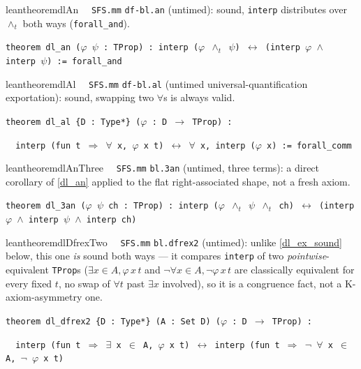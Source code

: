 \begin{restatable}{leantheorem}{dlAn}~~ \texttt{SFS.mm} \texttt{df-bl.an} (untimed): sound, \texttt{interp} distributes over $\wedge_t$ both ways (\texttt{forall\_and}).

\texttt{\textcolor{leancolor}{theorem} \textcolor{leanyellow}{dl\_an} ($\varphi$ $\psi$ : TProp) : interp ($\varphi$ $\wedge_t$ $\psi$) $\leftrightarrow$ (interp $\varphi$ $\wedge$ interp $\psi$) := forall\_and}
\label{dl_an}
\end{restatable}

\begin{restatable}{leantheorem}{dlAl}~~ \texttt{SFS.mm} \texttt{df-bl.al} (untimed universal-quantification exportation): sound, swapping two $\forall$s is always valid.

\texttt{\textcolor{leancolor}{theorem} \textcolor{leanyellow}{dl\_al} \{D : Type*\} ($\varphi$ : D $\to$ TProp) :}

\texttt{~~interp (\textcolor{leancolor}{fun} t $\Rightarrow$ $\forall$ x, $\varphi$ x t) $\leftrightarrow$ $\forall$ x, interp ($\varphi$ x) := forall\_comm}
\label{dl_al}
\end{restatable}

\begin{restatable}{leantheorem}{dlAnThree}~~ \texttt{SFS.mm} \texttt{bl.3an} (untimed, three terms): a direct corollary of \ref{dl_an} applied to the flat right-associated shape, not a fresh axiom.

\texttt{\textcolor{leancolor}{theorem} \textcolor{leanyellow}{dl\_3an} ($\varphi$ $\psi$ ch : TProp) : interp ($\varphi$ $\wedge_t$ $\psi$ $\wedge_t$ ch) $\leftrightarrow$ (interp $\varphi$ $\wedge$ interp $\psi$ $\wedge$ interp ch)}
\label{dl_3an}
\end{restatable}

\begin{restatable}{leantheorem}{dlDfrexTwo}~~ \texttt{SFS.mm} \texttt{bl.dfrex2} (untimed): unlike \ref{dl_ex_sound} below, this one \emph{is} sound both ways --- it compares \texttt{interp} of two \emph{pointwise}-equivalent \texttt{TProp}s ($\exists x\in A,\varphi\,x\,t$ and $\neg\forall x\in A,\neg\varphi\,x\,t$ are classically equivalent for every fixed $t$, no swap of $\forall t$ past $\exists x$ involved), so it is a congruence fact, not a K-axiom-asymmetry one.

\texttt{\textcolor{leancolor}{theorem} \textcolor{leanyellow}{dl\_dfrex2} \{D : Type*\} (A : Set D) ($\varphi$ : D $\to$ TProp) :}

\texttt{~~interp (\textcolor{leancolor}{fun} t $\Rightarrow$ $\exists$ x $\in$ A, $\varphi$ x t) $\leftrightarrow$ interp (\textcolor{leancolor}{fun} t $\Rightarrow$ $\neg$ $\forall$ x $\in$ A, $\neg$ $\varphi$ x t)}
\label{dl_dfrex2}
\end{restatable}

